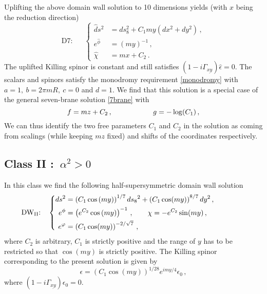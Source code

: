 \documentclass[12pt,a4paper]{article}
\begin{document}
Uplifting the above domain wall solution to 10 dimensions yields
(with $x$ being the reduction direction)
\begin{equation}
\text{D7:~~~~~}\left\{\begin{aligned}
\hat{d}s^2 & = ds_8^2+C_1 m y\left(dx^2+dy^2 \right)\,,\\
e^{\hat\phi} & = (m y)^{-1} \,,\\
\hat\chi & = m x + C_2 \, .\end{aligned}\right.
\end{equation}
 The uplifted Killing spinor is constant and still satisfies
$(1-i\Gamma_{\underline{xy}})\hat\epsilon=0$. The scalars and
spinors satisfy the monodromy requirement \eqref{monodromy} with
$a=1 ,\ b= 2\pi mR ,\ c=0 $ and $d=1$. We find that this solution
is a special case of the general seven-brane solution
\eqref{7brane} with
\begin{equation}
  f = m z+C_2\, ,\hskip 2truecm
  g = -\log(C_1) \, ,
\end{equation}
We can thus identify the two free parameters $C_1$ and
$C_2$ in the solution as coming from scalings (while keeping $m z$ fixed) and
shifts of the coordinates respectively.


\subsection{Class II :\ $\alpha^2 > 0$}

In this class we find the following half-supersymmetric domain wall
solution
\begin{equation}
  \text{DW$_{\text{II}}$:~~~}\left\{\begin{aligned}
  ds^2 & = \left(C_1 \cos{(m y)}\right)^{1/7}ds_8{}^2
    + \left(C_1 \cos(m y)\right)^{8/7}dy^2 \,, \hskip 1.5truecm\\
   e^\phi & = \left(e^{C_2}\cos{(m y)}\right)^{-1}\, , \qquad
   \chi = -e^{C_2} \sin(m y) \,, \\
   e^\varphi & = \left(C_1 \cos(m y)\right)^{-2/\sqrt{7}} \,,
   \end{aligned}\right.\label{DWII}
\end{equation}
where $C_2$ is arbitrary, $C_1$ is strictly positive and the range of $y$
has to be restricted so that $\cos{(m y)}$ is strictly positive.
The Killing spinor corresponding to the present solution is given by
\begin{equation}
  \epsilon=\left(C_1 \cos{(m y)}\right)^{1/28}
  e^{i m y/4}\epsilon_0 \,,
\end{equation}
where $(1-i\Gamma_{\underline{xy}})\epsilon_0=0$.
\end{document}
